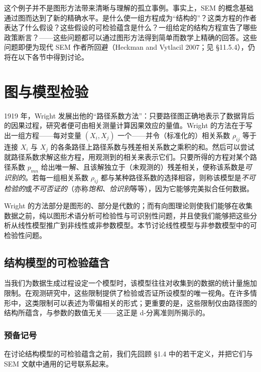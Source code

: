 这个例子并不是图形方法带来清晰与理解的孤立事例。事实上，SEM 的概念基础通过图而达到了新的精确水平。是什么使一组方程成为“结构的”？这类方程的作者表达了什么假设？这些假设的可检验蕴含是什么？一组给定的结构方程宣告了哪些政策断言？——这些问题都可以通过图形方法得到简单而数学上精确的回答。这些问题即便为现代 SEM 作者所回避（Heckman and Vytlacil 2007；见 \S 11.5.4），仍将在以下各节中得到讨论。

\section{图与模型检验}

1919 年，Wright 发展出他的“路径系数方法”：只要路径图正确地表示了数据背后的因果过程，研究者便可由相关测量计算因果效应的量值。Wright 的方法在于写出一组方程——每对变量 $(X_i,X_j)$ 一个——并令（标准化的）相关系数 $\rho_{ij}$ 等于连接 $X_i$ 与 $X_j$ 的各条路径上路径系数与残差相关系数之乘积的和。然后可以尝试就路径系数求解这些方程，用观测到的相关来表示它们。只要所得的方程对某个路径系数 $p_{mn}$ 给出唯一解、且该解独立于（未观测的）残差相关，便称该系数是\emph{可识别的}。若每一组相关系数 $\rho_{ij}$ 都与某种路径系数的选择相容，则称该模型是\emph{不可检验的}或\emph{不可否证的}（亦称\emph{饱和}、\emph{恰识别}等等），因为它能够完美拟合任何数据。

Wright 的方法部分是图形的、部分是代数的；而有向图理论则使我们能够在收集数据之前，纯以图形术语分析可检验性与可识别性问题，并且使我们能够把这些分析从线性模型推广到非线性或非参数模型。本节讨论线性模型与非参数模型中的可检验性问题。

\subsection{结构模型的可检验蕴含}

当我们为数据生成过程设定一个模型时，该模型往往对收集到的数据的统计量施加限制。在观测研究中，这些限制提供了检验或否证所设模型的唯一视角。在许多情形中，这类限制可以表述为零偏相关的形式；更重要的是，这些限制仅由路径图的结构所蕴含，与参数的数值无关——这正是 d-分离准则所揭示的。

\subsubsection*{预备记号}

在讨论结构模型的可检验蕴含之前，我们先回顾 \S 1.4 中的若干定义，并把它们与 SEM 文献中通用的记号联系起来。

